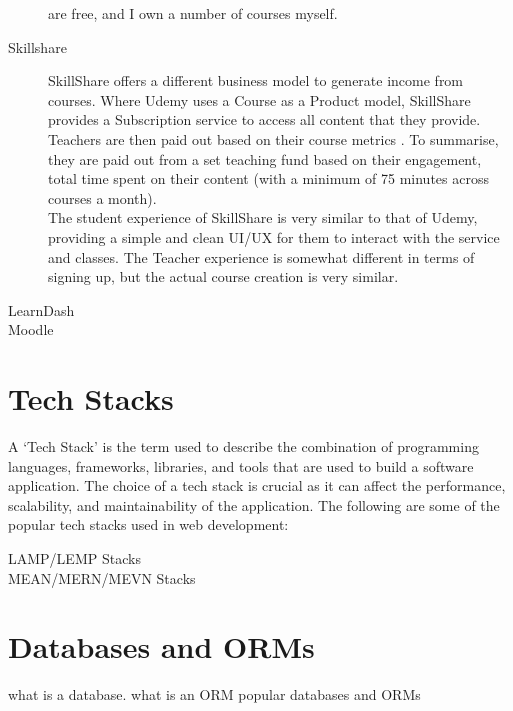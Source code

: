 \documentclass[12pt, a4paper,twoside]{report}
\theoremstyle{plain} %
\theoremstyle{definition} %
\numberwithin{equation}{chapter}
\begin{document}
\begin{description}
{        are free, and I own a number of courses myself.
    }
    \item[Skillshare] {
        SkillShare offers a different business model to generate income from
        courses. Where Udemy uses a Course as a Product model, SkillShare
        provides a Subscription service to access all content that they provide.
        Teachers are then paid out based on their course metrics
        \cite{skillshare-teacher-earnings}. To summarise, they are paid out from
        a set teaching fund based on their engagement, total time spent on their
        content (with a minimum of 75 minutes across courses a month).\\
        The student experience of SkillShare is very similar to that of Udemy,
        providing a simple and clean UI/UX for them to interact with the service
        and classes. The Teacher experience is somewhat different in terms of
        signing up, but the actual course creation is very similar.
        \cite{skillshare-ux-1}\cite{skillshare-ux-2}
    }
    \item[LearnDash] {}
    \item[Moodle] {}
\end{description}

\section{Tech Stacks}\label{sec:techstacks}

A `Tech Stack' is the term used to describe the combination of programming
languages, frameworks, libraries, and tools that are used to build a software
application. The choice of a tech stack is crucial as it can affect the
performance, scalability, and maintainability of the application. The following
are some of the popular tech stacks used in web development:

\begin{description}
    \item[LAMP/LEMP Stacks] {}
    \item[MEAN/MERN/MEVN Stacks] {}
\end{description}

\section{Databases and ORMs}\label{sec:databasesorms}

what is a database.
what is an ORM
popular databases and ORMs
\end{document}
